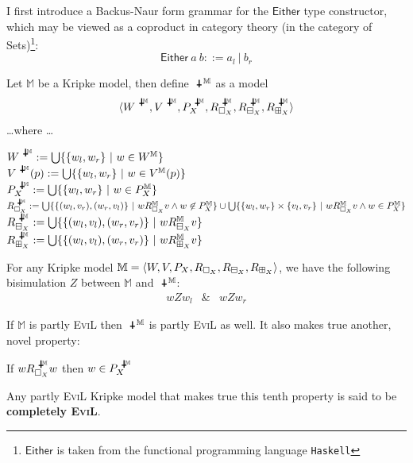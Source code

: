 I first introduce a Backus-Naur form grammar for the $\mathsf{Either}$ type constructor, which may be viewed as a coproduct in category theory (in the category of Sets)\footnote{$\mathsf{Either}$ is taken from the functional programming language \texttt{Haskell}}:
\[ \mathsf{Either}\ a\ b ::= a_l \ |\ b_r \]
\begin{mydef}
Let $\mathbb{M}$ be a Kripke model, then define $\invis^\mathbb{M}$ as a model
\[\la W^{\invis^\mathbb{M}},V^{\invis^\mathbb{M}}, P^{\invis^\mathbb{M}}_X,R^{\invis^\mathbb{M}}_{\Nec_X},R^{\invis^\mathbb{M}}_{\BB_X},R^{\invis^\mathbb{M}}_{\BBI_X}\ra\] 
\ldots where \ldots
\begin{tabbing}
$W^{\invis^\mathbb{M}} := \bigcup\{\{w_l,w_r\}\ |\ w\in W^\mathbb{M}\}$\\
$V^{\invis^\mathbb{M}}(p) := \bigcup\{\{w_l,w_r\}\ |\ w\in V^\mathbb{M}(p)\}$\\
$P^{\invis^\mathbb{M}}_X := \bigcup\{\{w_l,w_r\}\ |\  w\in P^\mathbb{M}_X\}$\\
$R^{\invis^\mathbb{M}}_{\Nec_X} := \bigcup\{\{(w_l,v_r),(w_r,v_l)\}\ |\ w R^\mathbb{M}_{\Nec_X} v \wedge w \nin P^\mathbb{M}_X\} \cup \bigcup\{\{w_l,w_r\}\times \{v_l,v_r\}\ |\ w R^\mathbb{M}_{\Nec_X} v \wedge w \in P^\mathbb{M}_X\}$\\
$R^{\invis^\mathbb{M}}_{\BB_X} := \bigcup\{\{(w_l,v_l),(w_r,v_r)\}\ | \ w R^\mathbb{M}_{\BB_X} v \}$ \\
$R^{\invis^\mathbb{M}}_{\BBI_X} := \bigcup\{\{(w_l,v_l),(w_r,v_r)\}\ | \ w R^\mathbb{M}_{\BBI_X} v \}$
\end{tabbing}

\end{mydef}
\begin{lemma}\label{bisimulation}
For any Kripke model $\mathbb{M} = \langle W,V,P_X,R_{\Box_X},R_{\boxminus_X}, R_{\boxplus_X}\rangle$, we have the following bisimulation $Z$ between $\mathbb{M}$ and $\invis^\mathbb{M}$:
\begin{eqnarray*} w Z w_l & \& & w Z w_r \end{eqnarray*}
\end{lemma}

\begin{lemma}
If $\mathbb{M}$ is partly \textsc{EviL} then $\invis^\mathbb{M}$ is partly \textsc{EviL} as well.  It also makes true another, novel property: 
\begin{mynum}[start=10,resume]
\item If $w R^{\invis^\mathbb{M}}_{\Nec_X} w$ then $w\in P^{\invis^\mathbb{M}}_X$
\end{mynum}
Any partly \textsc{EviL} Kripke model that makes true this tenth property is said to be \textbf{completely \textsc{EviL}}.
\end{lemma}

